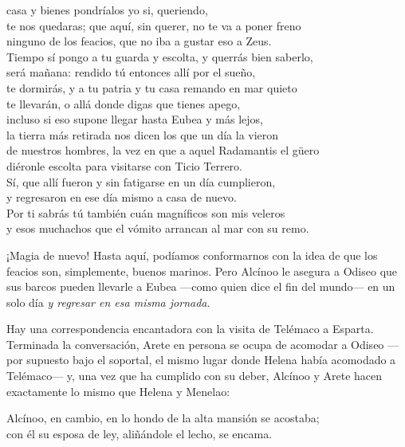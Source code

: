 \begin{versocita}
[...] casa y bienes pondríalos yo si, queriendo,\\
te nos quedaras; que aquí, sin querer, no te va a poner freno\\
ninguno de los feacios, que no iba a gustar eso a Zeus.\\
\stanzabreak
Tiempo sí pongo a tu guarda y escolta, y querrás bien saberlo,\\
será mañana: rendido tú entonces allí por el sueño,\\
te dormirás, y a tu patria y tu casa remando en mar quieto\\
te llevarán, o allá donde digas que tienes apego,\\
incluso si eso supone llegar hasta Eubea y más lejos,\\
la tierra más retirada nos dicen los que un día la vieron\\
de nuestros hombres, la vez en que a aquel Radamantis el güero\\
diéronle escolta para visitarse con Ticio Terrero.\\
\stanzabreak
Sí, que allí fueron y sin fatigarse en un día cumplieron,\\
y regresaron en ese día mismo a casa de nuevo.\\
Por ti sabrás tú también cuán magníficos son mis veleros\\
y esos muchachos que el vómito arrancan al mar con su remo.
\end{versocita}

¡Magia de nuevo! Hasta aquí, podíamos conformarnos con la idea de que los feacios son, simplemente, buenos marinos. Pero Alcínoo le asegura a Odiseo que sus barcos pueden llevarle a Eubea ---como quien dice el fin del mundo--- en un solo día \emph{y regresar en esa misma jornada}.

Hay una correspondencia encantadora con la visita de Telémaco a Esparta. Terminada la conversación, Arete en persona se ocupa de acomodar a Odiseo ---por supuesto bajo el soportal, el mismo lugar donde Helena había acomodado a Telémaco--- y, una vez que ha cumplido con su deber, Alcínoo y Arete hacen exactamente lo mismo que Helena y Menelao:

\begin{versocita}
Alcínoo, en cambio, en lo hondo de la alta mansión se acostaba;\\
con él su esposa de ley, aliñándole el lecho, se encama.
\end{versocita}
